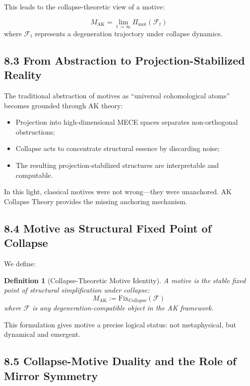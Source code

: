 \documentclass[11pt]{article}
\newtheorem{definition}[theorem]{Definition}
\begin{document}
This leads to the collapse-theoretic view of a motive:

\begin{equation}
M_{\mathrm{AK}} = \lim_{t \to \infty} \Pi_{\mathrm{mot}}(\mathcal{F}_t)
\end{equation}
where $\mathcal{F}_t$ represents a degeneration trajectory under collapse dynamics.

\subsection{8.3 From Abstraction to Projection-Stabilized Reality}

The traditional abstraction of motives as “universal cohomological atoms” becomes grounded through AK theory:

\begin{itemize}
    \item Projection into high-dimensional MECE spaces separates non-orthogonal obstructions;
    \item Collapse acts to concentrate structural essence by discarding noise;
    \item The resulting projection-stabilized structures are interpretable and computable.
\end{itemize}

In this light, classical motives were not wrong—they were unanchored. AK Collapse Theory provides the missing anchoring mechanism.

\subsection{8.4 Motive as Structural Fixed Point of Collapse}

We define:

\begin{definition}[Collapse-Theoretic Motive Identity]
A motive is the stable fixed point of structural simplification under collapse:
\[
M_{\mathrm{AK}} := \mathrm{Fix}_{\mathrm{Collapse}}(\mathcal{F})
\]
where $\mathcal{F}$ is any degeneration-compatible object in the AK framework.
\end{definition}

This formulation gives motive a precise logical status: not metaphysical, but dynamical and emergent.

\subsection{8.5 Collapse-Motive Duality and the Role of Mirror Symmetry}
\end{document}
